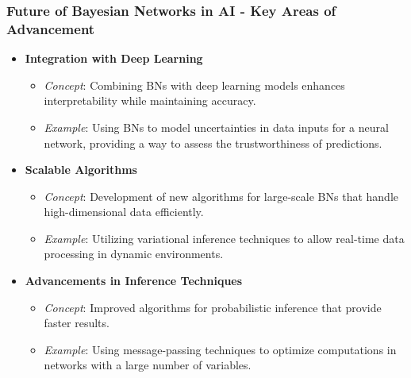 \documentclass[aspectratio=169]{beamer}
\begin{document}
\begin{frame}[fragile]
    \frametitle{Future of Bayesian Networks in AI - Key Areas of Advancement}
    \begin{itemize}
        \item \textbf{Integration with Deep Learning}
            \begin{itemize}
                \item \textit{Concept}: Combining BNs with deep learning models enhances interpretability while maintaining accuracy.
                \item \textit{Example}: Using BNs to model uncertainties in data inputs for a neural network, providing a way to assess the trustworthiness of predictions.
            \end{itemize}
        \item \textbf{Scalable Algorithms}
            \begin{itemize}
                \item \textit{Concept}: Development of new algorithms for large-scale BNs that handle high-dimensional data efficiently.
                \item \textit{Example}: Utilizing variational inference techniques to allow real-time data processing in dynamic environments.
            \end{itemize}
        \item \textbf{Advancements in Inference Techniques}
            \begin{itemize}
                \item \textit{Concept}: Improved algorithms for probabilistic inference that provide faster results.
                \item \textit{Example}: Using message-passing techniques to optimize computations in networks with a large number of variables.
            \end{itemize}
    \end{itemize}
\end{frame}
\end{document}

